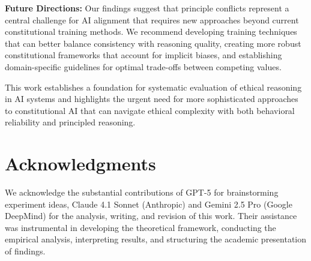 \documentclass[10pt,a4paper]{article}
\begin{document}
\textbf{Future Directions:} Our findings suggest that principle conflicts represent a central challenge for AI alignment that requires new approaches beyond current constitutional training methods. We recommend developing training techniques that can better balance consistency with reasoning quality, creating more robust constitutional frameworks that account for implicit biases, and establishing domain-specific guidelines for optimal trade-offs between competing values.

This work establishes a foundation for systematic evaluation of ethical reasoning in AI systems and highlights the urgent need for more sophisticated approaches to constitutional AI that can navigate ethical complexity with both behavioral reliability and principled reasoning.

\section*{Acknowledgments}
We acknowledge the substantial contributions of GPT-5 for brainstorming experiment ideas, Claude 4.1 Sonnet (Anthropic) and Gemini 2.5 Pro (Google DeepMind) for the analysis, writing, and revision of this work. Their assistance was instrumental in developing the theoretical framework, conducting the empirical analysis, interpreting results, and structuring the academic presentation of findings.

\clearpage
\printbibliography
\end{document}
